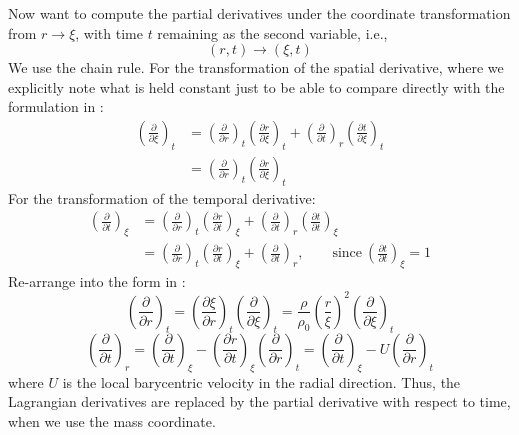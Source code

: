 \documentclass[12pt,notitlepage]{article}
\begin{document}
Now want to compute the partial derivatives under the coordinate transformation from $r \rightarrow \xi$, with time $t$ remaining as the second variable, i.e.,
\begin{equation}
(r,t) \rightarrow (\xi,t)
\end{equation}
We use the chain rule.  For the transformation of the spatial derivative, where we explicitly note what is held constant just to be able to compare directly with the formulation in \cite{ABE95}:
\begin{align}
\left( \frac{\partial}{\partial \xi} \right)_t &= \left( \frac{\partial}{\partial r} \right)_t \left( \frac{\partial r}{\partial \xi} \right)_t + \left( \frac{\partial}{\partial t} \right)_r \left( \frac{\partial t}{\partial \xi} \right)_t\\
&= \left( \frac{\partial}{\partial r} \right)_t \left( \frac{\partial r}{\partial \xi} \right)_t
\end{align}
For the transformation of the temporal derivative:
\begin{align}
\left( \frac{\partial}{\partial t} \right)_\xi &= \left( \frac{\partial}{\partial r} \right)_t \left( \frac{\partial r}{\partial t} \right)_\xi + \left( \frac{\partial}{\partial t} \right)_r \left( \frac{\partial t}{\partial t} \right)_\xi\\
&= \left( \frac{\partial}{\partial r} \right)_t \left( \frac{\partial r}{\partial t} \right)_\xi + \left( \frac{\partial}{\partial t} \right)_r, \qquad \text{since}\ \left( \frac{\partial t}{\partial t}\right)_\xi=1
\end{align}
Re-arrange into the form in \cite{ABE95}:
\begin{equation}
\left( \frac{\partial}{\partial r} \right)_t = \left( \frac{\partial \xi}{\partial r} \right)_t \left( \frac{\partial}{\partial \xi} \right)_t = \frac{\rho}{\rho_0} \left( \frac{r}{\xi} \right)^2 \left(\frac{\partial}{\partial \xi} \right)_t
\label{eq:ddr}
\end{equation}
\begin{equation}
 \left( \frac{\partial}{\partial t} \right)_r  = \left( \frac{\partial}{\partial t} \right)_\xi - \left( \frac{\partial r}{\partial t} \right)_\xi  \left( \frac{\partial}{\partial r} \right)_t = \left( \frac{\partial}{\partial t} \right)_\xi - U  \left( \frac{\partial}{\partial r} \right)_t
\end{equation}
where $U$ is the local barycentric velocity in the radial direction.  Thus, the Lagrangian derivatives are replaced by the partial derivative with respect to time, when we use the mass coordinate.
\end{document}
